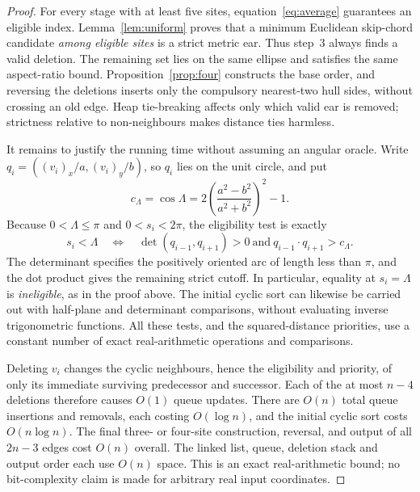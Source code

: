 \documentclass[11pt,a4paper]{article}
\theoremstyle{definition}\newtheorem{definition}[theorem]{Definition}
\theoremstyle{remark}\newtheorem{remark}[theorem]{Remark}
\begin{document}
\begin{proof}
For every stage with at least five sites, equation~\eqref{eq:average} guarantees an eligible index. Lemma~\ref{lem:uniform} proves that a minimum Euclidean skip-chord candidate \emph{among eligible sites} is a strict metric ear. Thus step~3 always finds a valid deletion. The remaining set lies on the same ellipse and satisfies the same aspect-ratio bound. Proposition~\ref{prop:four} constructs the base order, and reversing the deletions inserts only the compulsory nearest-two hull sides, without crossing an old edge. Heap tie-breaking affects only which valid ear is removed; strictness relative to non-neighbours makes distance ties harmless.

It remains to justify the running time without assuming an angular oracle. Write $q_i=((v_i)_x/a,(v_i)_y/b)$, so $q_i$ lies on the unit circle, and put
\[
 c_\Lambda=\cos\Lambda
 =2\left(\frac{a^2-b^2}{a^2+b^2}\right)^2-1.
\]
Because $0<\Lambda\le\pi$ and $0<s_i<2\pi$, the eligibility test is exactly
\begin{equation}\label{eq:algebraic-eligibility}
 s_i<\Lambda
 \quad\Longleftrightarrow\quad
 \det(q_{i-1},q_{i+1})>0
 \ \text{and}\ 
 q_{i-1}\mathbin{\cdot}q_{i+1}>c_\Lambda.
\end{equation}
The determinant specifies the positively oriented arc of length less than $\pi$, and the dot product gives the remaining strict cutoff. In particular, equality at $s_i=\Lambda$ is \emph{ineligible}, as in the proof above. The initial cyclic sort can likewise be carried out with half-plane and determinant comparisons, without evaluating inverse trigonometric functions. All these tests, and the squared-distance priorities, use a constant number of exact real-arithmetic operations and comparisons.

Deleting $v_i$ changes the cyclic neighbours, hence the eligibility and priority, of only its immediate surviving predecessor and successor. Each of the at most $n-4$ deletions therefore causes $O(1)$ queue updates. There are $O(n)$ total queue insertions and removals, each costing $O(\log n)$, and the initial cyclic sort costs $O(n\log n)$. The final three- or four-site construction, reversal, and output of all $2n-3$ edges cost $O(n)$ overall. The linked list, queue, deletion stack and output order each use $O(n)$ space. This is an exact real-arithmetic bound; no bit-complexity claim is made for arbitrary real input coordinates.
\end{proof}
\end{document}
